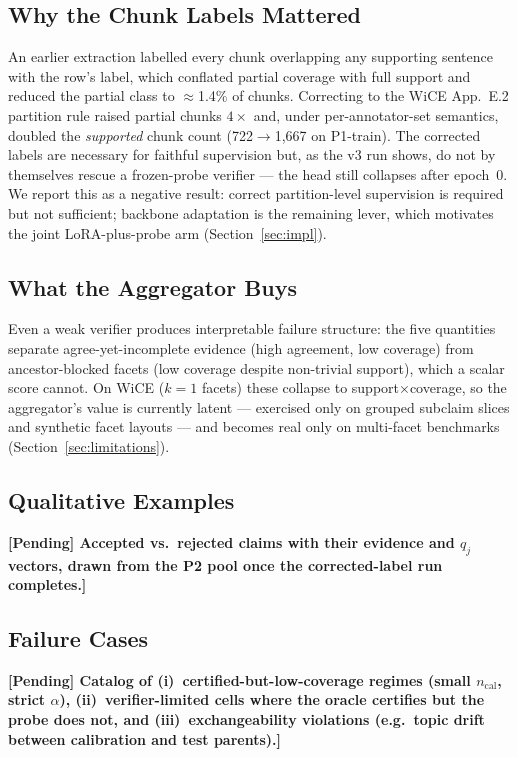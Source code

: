 \documentclass{article}
\begin{document}
\subsection{Why the Chunk Labels Mattered}
An earlier extraction labelled every chunk overlapping any supporting
sentence with the row's label, which conflated partial coverage with
full support and reduced the partial class to $\approx$1.4\% of chunks.
Correcting to the WiCE App.~E.2 partition rule raised partial chunks
$4\times$ and, under per-annotator-set semantics, doubled the
\emph{supported} chunk count (722$\to$1{,}667 on P1-train). The corrected
labels are necessary for faithful supervision but, as the v3 run shows,
do not by themselves rescue a frozen-probe verifier --- the head still
collapses after epoch~0. We report this as a negative result: correct
partition-level supervision is required but not sufficient; backbone
adaptation is the remaining lever, which motivates the joint
LoRA-plus-probe arm (Section~\ref{sec:impl}).

\subsection{What the Aggregator Buys}
Even a weak verifier produces interpretable failure structure: the five
quantities separate agree-yet-incomplete evidence (high agreement, low
coverage) from ancestor-blocked facets (low coverage despite
non-trivial support), which a scalar score cannot. On WiCE ($k{=}1$
facets) these collapse to support$\times$coverage, so the aggregator's
value is currently latent --- exercised only on grouped subclaim slices
and synthetic facet layouts --- and becomes real only on multi-facet
benchmarks (Section~\ref{sec:limitations}).

\subsection{Qualitative Examples}
\textbf{[Pending] Accepted vs.\ rejected claims with their evidence
and $q_j$ vectors, drawn from the P2 pool once the corrected-label
run completes.]}

\subsection{Failure Cases}
\textbf{[Pending] Catalog of (i)~certified-but-low-coverage regimes
(small $n_{\mathrm{cal}}$, strict $\alpha$), (ii)~verifier-limited
cells where the oracle certifies but the probe does not, and
(iii)~exchangeability violations (e.g.\ topic drift between calibration
and test parents).]}
\end{document}
